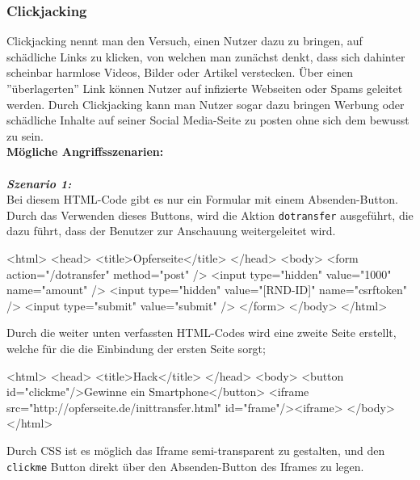 \subsubsection{Clickjacking}

Clickjacking nennt man den Versuch, einen Nutzer dazu zu bringen, auf schädliche Links zu klicken, von welchen man zunächst denkt, dass sich dahinter scheinbar harmlose Videos, Bilder oder Artikel verstecken. Über einen ''überlagerten'' Link können Nutzer auf infizierte Webseiten oder Spams geleitet werden. Durch Clickjacking kann man Nutzer sogar dazu bringen Werbung oder schädliche Inhalte auf seiner Social Media-Seite zu posten ohne sich dem bewusst zu sein\cite{cj16}.\\

\textbf{Mögliche Angriffsszenarien:}\\
\\
\textbf{\textit{Szenario 1:}}\\

Bei diesem HTML-Code gibt es nur ein Formular mit einem Absenden-Button. Durch das Verwenden dieses Buttons, wird die Aktion \texttt{dotransfer} ausgeführt, die dazu führt, dass der Benutzer zur Anschauung weitergeleitet wird\cite{cjd13}.\\


\begin{LaTeXCode}[caption={Opferseite},captionpos=b, label=LaTeXCode:cj1][numbers=none]
<html>
	<head>
	<title>Opferseite</title>
	</head>
	<body>
	<form action="/dotransfer" method="post" />
		<input type="hidden" value="1000" name="amount" />
		<input type="hidden" value="[RND-ID]" name="csrftoken" />
		<input type="submit" value="submit" />
	</form>
	</body>
</html>
\end{LaTeXCode}

Durch die weiter unten verfassten HTML-Codes wird eine zweite Seite erstellt, welche für die die Einbindung der ersten Seite sorgt\cite{cjd13};\\

\begin{LaTeXCode}[caption={Hackseite},captionpos=b, label=LaTeXCode:cj2][numbers=none]
<html>
	<head>
	<title>Hack</title>
	</head>
	<body>
		<button id="clickme"/>Gewinne ein Smartphone</button>
		<iframe src="http://opferseite.de/inittransfer.html" id="frame"/><iframe>
	</body>
</html>
\end{LaTeXCode}

Durch CSS ist es möglich das Iframe semi-transparent zu gestalten, und den \texttt{clickme} Button direkt über den Absenden-Button des Iframes zu legen\cite{cjd13}.\\

